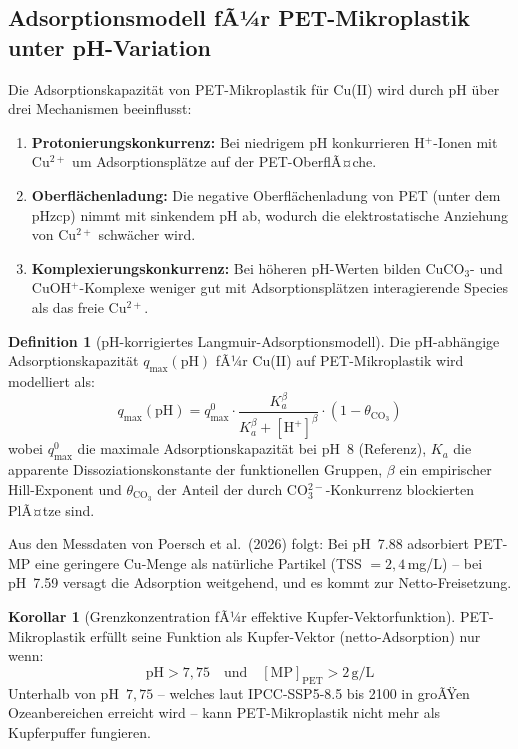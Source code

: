 ﻿\documentclass[12pt,a4paper]{article}
\theoremstyle{definition}
\newtheorem{definition}{Definition}[section]
\newtheorem{korollar}{Korollar}[section]
\theoremstyle{remark}
\begin{document}
\subsection{Adsorptionsmodell fÃ¼r PET-Mikroplastik unter pH-Variation}
\label{subsec:adsorption_model}

Die Adsorptionskapazit\"at von PET-Mikroplastik f\"ur Cu(II) wird durch pH
\"uber drei Mechanismen beeinflusst:
\begin{enumerate}[leftmargin=*]
  \item \textbf{Protonierungskonkurrenz:} Bei niedrigem pH konkurrieren H$^+$-Ionen
    mit Cu$^{2+}$ um Adsorptionspl\"atze auf der PET-OberflÃ¤che.
  \item \textbf{Oberfl\"achenladung:} Die negative Oberfl\"achenladung von PET
    (unter dem pHzcp) nimmt mit sinkendem pH ab, wodurch die elektrostatische
    Anziehung von Cu$^{2+}$ schw\"acher wird.
  \item \textbf{Komplexierungskonkurrenz:} Bei h\"oheren pH-Werten bilden
    CuCO$_3$- und CuOH$^+$-Komplexe weniger gut mit Adsorptionspl\"atzen interagierende
    Species als das freie Cu$^{2+}$.
\end{enumerate}

\begin{definition}[pH-korrigiertes Langmuir-Adsorptionsmodell]
Die pH-abh\"angige Adsorptionskapazit\"at $q_{\max}(\text{pH})$ fÃ¼r Cu(II)
auf PET-Mikroplastik wird modelliert als:
\begin{equation}
  q_{\max}(\text{pH}) = q_{\max}^0 \cdot
  \frac{K_a^\beta}{K_a^\beta + [\text{H}^+]^\beta}
  \cdot (1 - \theta_{\text{CO}_3})
  \label{eq:langmuir_ph}
\end{equation}
wobei $q_{\max}^0$ die maximale Adsorptionskapazit\"at bei pH~8 (Referenz),
$K_a$ die apparente Dissoziationskonstante der funktionellen Gruppen,
$\beta$ ein empirischer Hill-Exponent und $\theta_{\text{CO}_3}$
der Anteil der durch CO$_3^{2-}$-Konkurrenz blockierten PlÃ¤tze sind.
\end{definition}

Aus den Messdaten von Poersch et al.\ (2026) folgt: Bei pH~7.88 adsorbiert PET-MP
eine geringere Cu-Menge als nat\"urliche Partikel (TSS $= 2{,}4$\,mg/L) --
bei pH~7.59 versagt die Adsorption weitgehend, und es kommt zur Netto-Freisetzung.

\begin{korollar}[Grenzkonzentration fÃ¼r effektive Kupfer-Vektorfunktion]
PET-Mikroplastik erf\"ullt seine Funktion als Kupfer-Vektor (netto-Adsorption)
nur wenn:
\begin{equation}
  \text{pH} > 7{,}75 \quad \text{und} \quad
  [\text{MP}]_{\text{PET}} > 2\,\text{g/L}
  \label{eq:mp_vector_condition}
\end{equation}
Unterhalb von pH~$7{,}75$ -- welches laut IPCC-SSP5-8.5 bis 2100 in groÃŸen
Ozeanbereichen erreicht wird -- kann PET-Mikroplastik nicht mehr als
Kupferpuffer fungieren.
\end{korollar}
\end{document}
